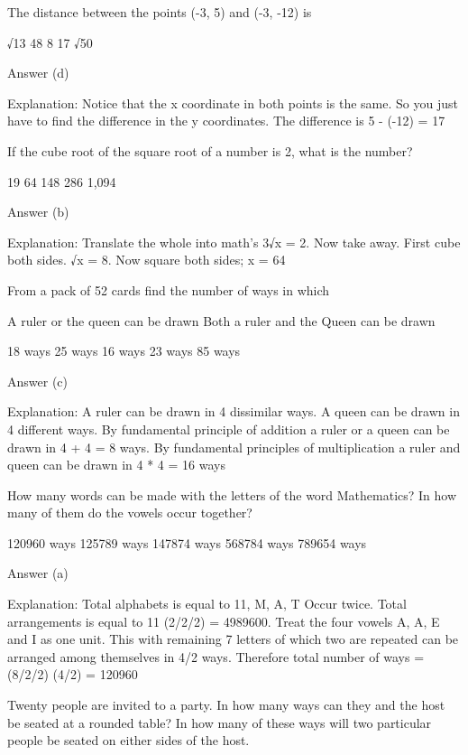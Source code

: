     The distance between the points (-3, 5) and (-3, -12) is

        √13
        48
        8
        17
        √50 

    Answer (d)

    Explanation: Notice that the x coordinate in both points is the same. So you just have to find the difference in the y coordinates. The difference is 5 - (-12) = 17

    If the cube root of the square root of a number is 2, what is the number?

        19
        64
        148
        286
        1,094 

    Answer (b)

    Explanation: Translate the whole into math's 3√x = 2. Now take away. First cube both sides. √x = 8. Now square both sides; x = 64

    From a pack of 52 cards find the number of ways in which

        A ruler or the queen can be drawn
        Both a ruler and the Queen can be drawn 

        18 ways
        25 ways
        16 ways
        23 ways
        85 ways 

    Answer (c)

    Explanation: A ruler can be drawn in 4 dissimilar ways. A queen can be drawn in 4 different ways. By fundamental principle of addition a ruler or a queen can be drawn in 4 + 4 = 8 ways. By fundamental principles of multiplication a ruler and queen can be drawn in 4 * 4 = 16 ways

    How many words can be made with the letters of the word Mathematics? In how many of them do the vowels occur together?

        120960 ways
        125789 ways
        147874 ways
        568784 ways
        789654 ways 

    Answer (a)

    Explanation: Total alphabets is equal to 11, M, A, T Occur twice. Total arrangements is equal to 11 (2/2/2) = 4989600. Treat the four vowels A, A, E and I as one unit. This with remaining 7 letters of which two are repeated can be arranged among themselves in 4/2 ways. Therefore total number of ways = (8/2/2) (4/2) = 120960

    Twenty people are invited to a party. In how many ways can they and the host be seated at a rounded table? In how many of these ways will two particular people be seated on either sides of the host.

